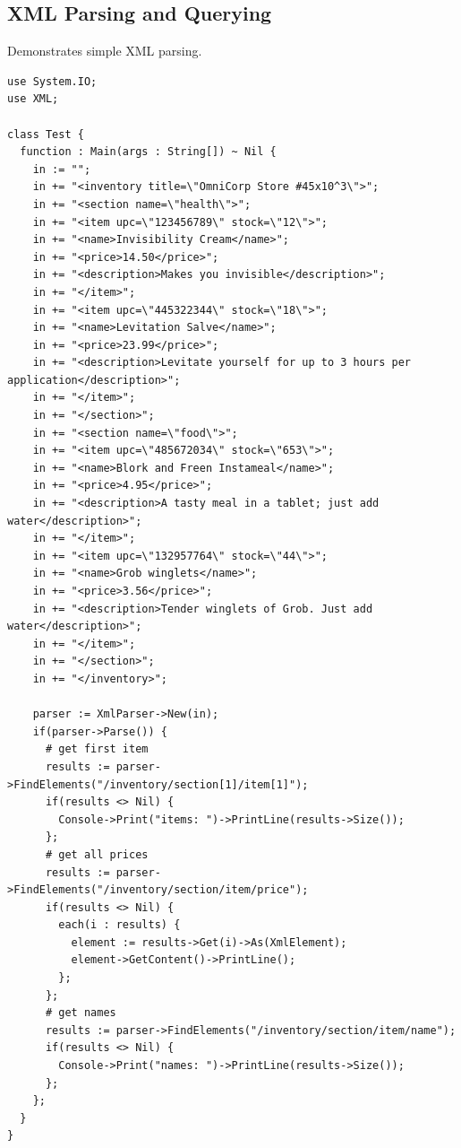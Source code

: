 \documentclass[11pt]{article}
\begin{document}
\subsection{XML Parsing and Querying}
Demonstrates simple XML parsing.
\begingroup
\fontsize{8pt}{9pt}\selectfont
\begin{verbatim}
use System.IO;
use XML;

class Test {
  function : Main(args : String[]) ~ Nil {
    in := "";
    in += "<inventory title=\"OmniCorp Store #45x10^3\">";
    in += "<section name=\"health\">";
    in += "<item upc=\"123456789\" stock=\"12\">";
    in += "<name>Invisibility Cream</name>";
    in += "<price>14.50</price>";
    in += "<description>Makes you invisible</description>";
    in += "</item>";
    in += "<item upc=\"445322344\" stock=\"18\">";
    in += "<name>Levitation Salve</name>";
    in += "<price>23.99</price>";
    in += "<description>Levitate yourself for up to 3 hours per application</description>";
    in += "</item>";
    in += "</section>";
    in += "<section name=\"food\">";
    in += "<item upc=\"485672034\" stock=\"653\">";
    in += "<name>Blork and Freen Instameal</name>";
    in += "<price>4.95</price>";
    in += "<description>A tasty meal in a tablet; just add water</description>";
    in += "</item>";
    in += "<item upc=\"132957764\" stock=\"44\">";
    in += "<name>Grob winglets</name>";
    in += "<price>3.56</price>";
    in += "<description>Tender winglets of Grob. Just add water</description>";
    in += "</item>";
    in += "</section>";
    in += "</inventory>";
  
    parser := XmlParser->New(in);
    if(parser->Parse()) {
      # get first item
      results := parser->FindElements("/inventory/section[1]/item[1]");
      if(results <> Nil) {
        Console->Print("items: ")->PrintLine(results->Size());
      };
      # get all prices
      results := parser->FindElements("/inventory/section/item/price");
      if(results <> Nil) {
        each(i : results) {          
          element := results->Get(i)->As(XmlElement);
          element->GetContent()->PrintLine();
        };
      };
      # get names
      results := parser->FindElements("/inventory/section/item/name");
      if(results <> Nil) {
        Console->Print("names: ")->PrintLine(results->Size());
      };
    };
  }
}
\end{verbatim}
\endgroup
\end{document}
